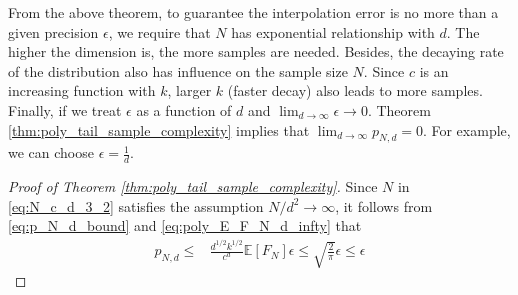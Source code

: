 \documentclass[conference,a4paper]{IEEEtran}
\def\E{\mathbb{E}}
\begin{document}
From the above theorem, to guarantee the interpolation error is no more than a given precision $\epsilon$,
we require that $N$ has exponential relationship with $d$.
The higher the dimension is, the more samples are needed.
Besides, the decaying rate of the distribution also has influence on the sample size $N$.
Since $c$ is an increasing function with $k$,
larger $k$ (faster decay) also leads to more samples.
Finally, if we treat $\epsilon$ as a function of $d$ and $\lim_{d\to\infty}\epsilon \to 0$.
Theorem \ref{thm:poly_tail_sample_complexity} implies that $\lim_{d\to\infty} p_{N,d} = 0$.
For example, we can choose $\epsilon=\frac{1}{d}$.

\begin{proof}[Proof of Theorem \ref{thm:poly_tail_sample_complexity}]

Since $N$ in \eqref{eq:N_c_d_3_2} satisfies the assumption $N/d^2 \to \infty$,
it follows from \eqref{eq:p_N_d_bound} and \eqref{eq:poly_E_F_N_d_infty} that
\begin{align*}
p_{N,d} \leq &\frac{d^{1/2}k^{1/2}}{c^d} \E[F_N]\epsilon
\leq \sqrt{\frac{2}{\pi}}\epsilon \leq \epsilon
\end{align*}
\end{proof}
\end{document}
